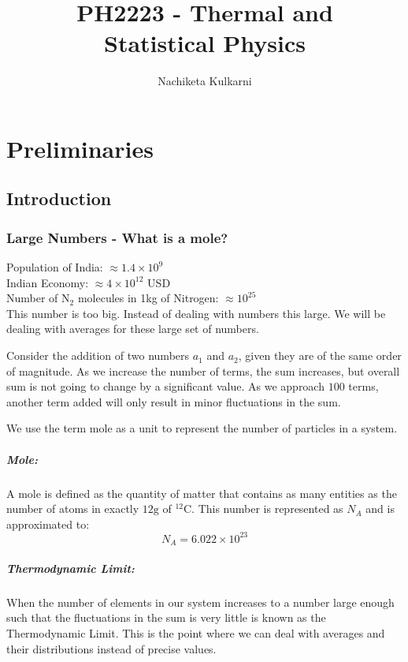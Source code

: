 \documentclass[12pt, oneside]{book}
\date{}
\title{PH2223 - Thermal and\\Statistical Physics}
\author{Nachiketa Kulkarni}
\begin{document}
\maketitle
\tableofcontents

\mainmatter
\chapter{Preliminaries}
\section{Introduction}
\subsection{Large Numbers - What is a mole?}
Population of India: \( \approx 1.4 \times 10^9\)\\
Indian Economy: \( \approx 4 \times 10^{12} \) USD\\
Number of \(\text{N}_2\) molecules in 1kg of Nitrogen: \( \approx 10^{25} \)\\

This number is too big.
Instead of dealing with numbers this large.
We will be dealing with averages for these large set of numbers.

Consider the addition of two numbers \(a_1\) and \(a_2\), given they are of the same order of magnitude.
As we increase the number of terms, the sum increases, but overall sum is not going to change by a significant value.
As we approach \(100\) terms, another term added will only result in minor fluctuations in the sum. 

We use the term mole as a unit to represent the number of particles in a system.
\paragraph{Mole:}A mole is defined as the quantity of matter that contains as many entities as the number of atoms in exactly \(12\text{g}\) of \(^{12}\text{C}\).
This number is represented as \(N_A\) and is approximated to:
\[ N_A = 6.022 \times 10^{23} \]

\paragraph{Thermodynamic Limit:} When the number of elements in our system increases to a number large enough such that the fluctuations in the sum is very little is known as the Thermodynamic Limit.
This is the point where we can deal with averages and their distributions instead of precise values.
\end{document}
